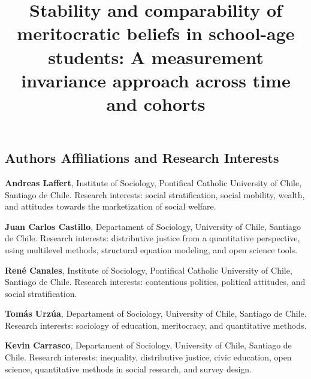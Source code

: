 \documentclass[
  12pt,
  letterpaper,
  DIV=11,
  numbers=noendperiod]{scrartcl}
\title{Stability and comparability of meritocratic beliefs in school-age
students: A measurement invariance approach across time and cohorts}
\author{}
\date{}
\begin{document}
\maketitle


\subsection{Authors Affiliations and Research
Interests}\label{authors-affiliations-and-research-interests}

\textbf{Andreas Laffert}, Institute of Sociology, Pontifical Catholic
University of Chile, Santiago de Chile. Research interests: social
stratification, social mobility, wealth, and attitudes towards the
marketization of social welfare.

\textbf{Juan Carlos Castillo}, Departament of Sociology, University of
Chile, Santiago de Chile. Research interests: distributive justice from
a quantitative perspective, using multilevel methods, structural
equation modeling, and open science tools.

\textbf{René Canales}, Institute of Sociology, Pontifical Catholic
University of Chile, Santiago de Chile. Research interests: contentious
politics, political attitudes, and social stratification.

\textbf{Tomás Urzúa}, Departament of Sociology, University of Chile,
Santiago de Chile. Research interests: sociology of education,
meritocracy, and quantitative methods.

\textbf{Kevin Carrasco}, Departament of Sociology, University of Chile,
Santiago de Chile. Research interests: inequality, distributive justice,
civic education, open science, quantitative methods in social research,
and survey design.
\end{document}
